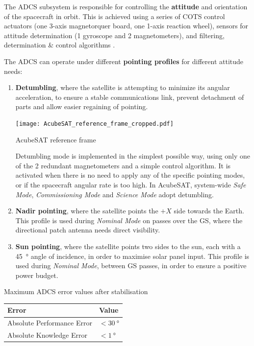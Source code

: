 \documentclass[a4paper,nobib]{tufte-book}
\begin{document}
The \ac{ADCS} subsystem is responsible for controlling the \textbf{attitude} and orientation of the spacecraft in orbit. This is achieved using a series of \ac{COTS} control actuators (one 3-axis magnetorquer board, one 1-axis reaction wheel), sensors for attitude determination (1 gyroscope and 2 magnetometers), and filtering, determination \& control algorithms \autocite{DDJF_AOCS}.

The \ac{ADCS} can operate under different \textbf{pointing profiles} for different attitude needs:
\begin{enumerate}
	\item \textbf{Detumbling}, where the satellite is attempting to minimize its angular acceleration, to ensure a stable communications link, prevent detachment of parts and allow easier regaining of pointing.
	
	\begin{marginfigure}
		\centering
		\texttt{[image: AcubeSAT\_reference\_frame\_cropped.pdf]}
		\caption{AcubeSAT reference frame}
		\label{fig:frame}
	\end{marginfigure}
	
	Detumbling mode is implemented in the simplest possible way, using only one of the 2 redundant magnetometers and a simple control algorithm. It is activated when there is no need to apply any of the specific pointing modes, or if the spacecraft angular rate is too high. In AcubeSAT, system-wide \emph{Safe Mode}, \emph{Commissioning Mode} and \emph{Science Mode} adopt detumbling.
	
	\item \textbf{Nadir pointing}, where the satellite points the \(+X\) side towards the Earth. This profile is used during \emph{Nominal Mode} on passes over the \acl{GS}, where the directional patch antenna needs direct visibility.
	
	\item \textbf{Sun pointing}, where the satellite points two sides to the sun, each with a \SI{45}{\degree} angle of incidence, in order to maximise solar panel input. This profile is used during \emph{Nominal Mode}, between \ac{GS} passes, in order to ensure a positive power budget.
\end{enumerate}

\begin{margintable}
	\centering
	\caption[Maximum ADCS error values after stabilisation]{Maximum \ac{ADCS} error values after stabilisation}
	\label{tab:adcsape}
	\begin{tabular}{@{}ll@{}}
		\toprule
		Error                      & Value                    \\ \midrule
		Absolute Performance Error & \( < \SI{30}{\degree} \) \\
		Absolute Knowledge Error   & \( < \SI{1}{\degree} \) 
	\end{tabular}
\end{margintable}
\end{document}

